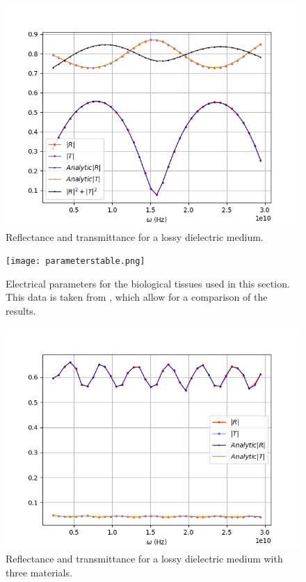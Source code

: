 \documentclass[12pt, oneside]{book}
\begin{document}
\begin{figure}
\centering
\includegraphics[scale=0.7]{rytvspanel(2).png}
\caption{Reflectance and transmittance for a lossy dielectric medium.}\label{rytvspanel}
\end{figure}

\begin{figure}
\centering
\texttt{[image: parameterstable.png]}
\caption{Electrical parameters for the biological tissues used in this section. This data is taken from \cite{smith2012stochastic}, which allow for a comparison of the results.}\label{parameterstable}
\end{figure}

\begin{figure}
\centering
\includegraphics[scale=0.7]{rytvspanel3materiales(3).png}
\caption{Reflectance and transmittance for a lossy dielectric medium with three materials.}\label{rytvspanel3materiales}
\end{figure}
\end{document}
